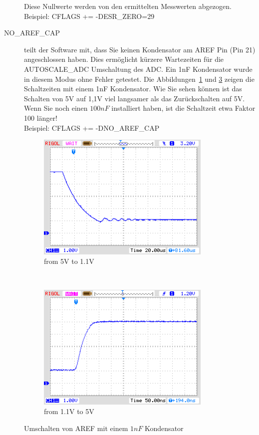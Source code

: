 \begin{description}
 Diese Nullwerte werden von den ermittelten Messwerten abgezogen.
Beispiel: CFLAGS += -DESR\_ZERO=29
  \item[NO\_AREF\_CAP] teilt der Software mit, dass Sie keinen Kondensator am AREF Pin (Pin 21) angeschlossen haben.
Dies ermöglicht kürzere Wartezeiten für die AUTOSCALE\_ADC Umschaltung des ADC.
Ein 1nF Kondensator wurde in diesem Modus ohne Fehler getestet.
Die Abbildungen~\ref{pic:aref1} und \ref{pic:aref5} zeigen die Schaltzeiten mit einem 1nF Kondensator.
Wie Sie sehen können ist das Schalten von 5V auf 1,1V viel langsamer als das Zurückschalten auf 5V.
Wenn Sie noch einen \(100 nF\) installiert haben, ist die Schaltzeit etwa Faktor 100 länger!\\
Beispiel: CFLAGS += -DNO\_AREF\_CAP

\end{description}

\begin{figure}[H]
  \begin{subfigure}[b]{8.6cm}
    \centering
    \includegraphics[width=8.3cm]{../PNG/AREF2_1V.png}
    \caption{from 5V to 1.1V }
    \label{pic:aref1}
  \end{subfigure}
  ~
  \begin{subfigure}[b]{8.6cm}
    \centering
    \includegraphics[width=8.3cm]{../PNG/AREF2VCC.png}
    \caption{from 1.1V to 5V}
    \label{pic:aref5}
  \end{subfigure}
  \caption{Umschalten von AREF mit einem \(1nF\) Kondensator}
\end{figure}

